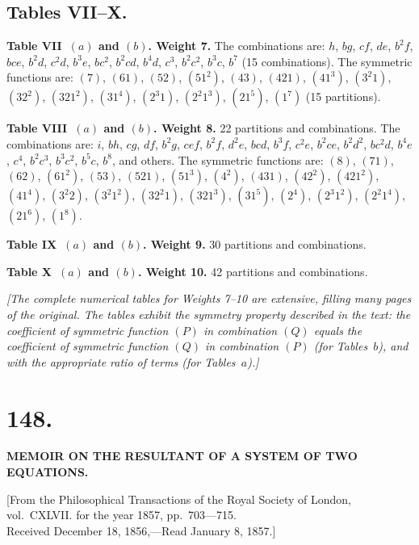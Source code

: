 \documentclass[11pt,a4paper]{book}
\begin{document}
\begin{center}
\newpage
\subsection*{Tables VII--X.}

\textbf{Table VII~$(a)$ and $(b)$. Weight 7.} The combinations are:
$h$, $bg$, $cf$, $de$, $b^2 f$, $bce$, $b^2 d$, $c^2 d$, $b^3 e$, $bc^2$,
$b^2 cd$, $b^4 d$, $c^3$, $b^2 c^2$, $b^3 c$, $b^7$ (15 combinations).
The symmetric functions are: $(7)$, $(61)$, $(52)$, $(51^2)$, $(43)$, $(421)$,
$(41^3)$, $(3^2 1)$, $(32^2)$, $(321^2)$, $(31^4)$, $(2^3 1)$, $(2^2 1^3)$,
$(21^5)$, $(1^7)$ (15 partitions).

\textbf{Table VIII~$(a)$ and $(b)$. Weight 8.} 22 partitions and combinations.
The combinations are: $i$, $bh$, $cg$, $df$, $b^2 g$, $cef$, $b^2 f$, $d^2 e$,
$bcd$, $b^3 f$, $c^2 e$, $b^2 ce$, $b^2 d^2$, $bc^2 d$, $b^4 e$, $c^4$,
$b^2 c^3$, $b^3 c^2$, $b^5 c$, $b^8$, and others.
The symmetric functions are: $(8)$, $(71)$, $(62)$, $(61^2)$, $(53)$, $(521)$,
$(51^3)$, $(4^2)$, $(431)$, $(42^2)$, $(421^2)$, $(41^4)$, $(3^2 2)$,
$(3^2 1^2)$, $(32^2 1)$, $(321^3)$, $(31^5)$, $(2^4)$, $(2^3 1^2)$,
$(2^2 1^4)$, $(21^6)$, $(1^8)$.

\textbf{Table IX~$(a)$ and $(b)$. Weight 9.} 30 partitions and combinations.

\textbf{Table X~$(a)$ and $(b)$. Weight 10.} 42 partitions and combinations.

\textit{[The complete numerical tables for Weights 7--10 are extensive, filling
many pages of the original. The tables exhibit the symmetry property described
in the text: the coefficient of symmetric function $(P)$ in combination $(Q)$
equals the coefficient of symmetric function $(Q)$ in combination $(P)$ (for
Tables~$b$), and with the appropriate ratio of terms (for Tables~$a$).]}

\newpage
\section*{148.}
\begin{center}
\Large\bfseries
MEMOIR ON THE RESULTANT OF A SYSTEM OF TWO EQUATIONS.
\end{center}

\begin{flushright}
\small
[From the Philosophical Transactions of the Royal Society of London,\\
vol.~CXLVII. for the year 1857, pp.~703---715.\\
Received December 18, 1856,---Read January 8, 1857.]
\end{flushright}


\end{center}
\end{document}
